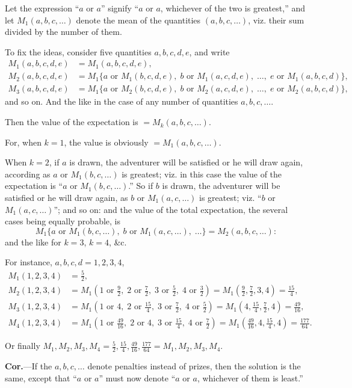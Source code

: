 \documentclass[11pt,a4paper]{book}
\begin{document}
\begin{solution}
Let the expression ``$a$ or $a$'' signify ``$a$ or $a$, whichever of the two is greatest,'' and let $M_1(a,b,c,\ldots)$ denote the mean of the quantities $(a,b,c,\ldots)$, viz. their sum divided by the number of them.

To fix the ideas, consider five quantities $a,b,c,d,e$, and write
\[
\begin{aligned}
M_1(a,b,c,d,e) &= M_1(a,b,c,d,e), \\
M_2(a,b,c,d,e) &= M_1\{a \text{ or } M_1(b,c,d,e), \; b \text{ or } M_1(a,c,d,e), \; \ldots, \; e \text{ or } M_1(a,b,c,d)\}, \\
M_3(a,b,c,d,e) &= M_1\{a \text{ or } M_2(b,c,d,e), \; b \text{ or } M_2(a,c,d,e), \; \ldots, \; e \text{ or } M_2(a,b,c,d)\},
\end{aligned}
\]
and so on. And the like in the case of any number of quantities $a,b,c,\ldots$.

Then the value of the expectation is $= M_k(a,b,c,\ldots)$.

For, when $k=1$, the value is obviously $=M_1(a,b,c,\ldots)$.

When $k=2$, if $a$ is drawn, the adventurer will be satisfied or he will draw again, according as $a$ or $M_1(b,c,\ldots)$ is greatest; viz. in this case the value of the expectation is ``$a$ or $M_1(b,c,\ldots)$.'' So if $b$ is drawn, the adventurer will be satisfied or he will draw again, as $b$ or $M_1(a,c,\ldots)$ is greatest; viz. ``$b$ or $M_1(a,c,\ldots)$''; and so on: and the value of the total expectation, the several cases being equally probable, is
\[
M_1\{a \text{ or } M_1(b,c,\ldots), \; b \text{ or } M_1(a,c,\ldots), \; \ldots\} = M_2(a,b,c,\ldots):
\]
and the like for $k=3$, $k=4$, \&c.

For instance, $a,b,c,d = 1,2,3,4$,
\[
\begin{aligned}
M_1(1,2,3,4) &= \tfrac{5}{2}, \\
M_2(1,2,3,4) &= M_1(1\text{ or }\tfrac{9}{2},\; 2\text{ or }\tfrac{7}{2},\; 3\text{ or }\tfrac{5}{2},\; 4\text{ or }\tfrac{3}{2}) = M_1(\tfrac{9}{2}, \tfrac{7}{2}, 3, 4) = \tfrac{15}{4}, \\
M_3(1,2,3,4) &= M_1(1\text{ or }4,\; 2\text{ or }\tfrac{15}{4},\; 3\text{ or }\tfrac{7}{2},\; 4\text{ or }\tfrac{5}{2}) = M_1(4, \tfrac{15}{4}, \tfrac{7}{2}, 4) = \tfrac{49}{16}, \\
M_4(1,2,3,4) &= M_1(1\text{ or }\tfrac{49}{16},\; 2\text{ or }4,\; 3\text{ or }\tfrac{15}{4},\; 4\text{ or }\tfrac{7}{2}) = M_1(\tfrac{49}{16}, 4, \tfrac{15}{4}, 4) = \tfrac{177}{64}.
\end{aligned}
\]

Or finally $M_1, M_2, M_3, M_4 = \tfrac{5}{2}, \tfrac{15}{4}, \tfrac{49}{16}, \tfrac{177}{64} = M_1, M_2, M_3, M_4$.

\medskip

\textbf{Cor.}---If the $a,b,c,\ldots$ denote penalties instead of prizes, then the solution is the same, except that ``$a$ or $a$'' must now denote ``$a$ or $a$, whichever of them is least.''
\end{solution}
\end{document}

